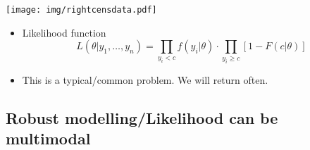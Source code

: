 \documentclass[captions=tableheading]{scrbook}
\begin{document}
\begin{center}

\texttt{[image: img/rightcensdata.pdf]}

\end{center}


\begin{itemize}
\item Likelihood function
  \[
  L(\theta | y_{1},\ldots,y_{n}) = \prod_{y_{i} < c} f(y_{i}|\theta)\cdot \prod_{y_{i}\geq c}\left[ 1 - F(c|\theta) \right]
  \]
\item This is a typical/common problem.  We will return often.
\end{itemize}
\subsection{Robust modelling/Likelihood can be multimodal}
\label{sec-1_2_2}
\end{document}
